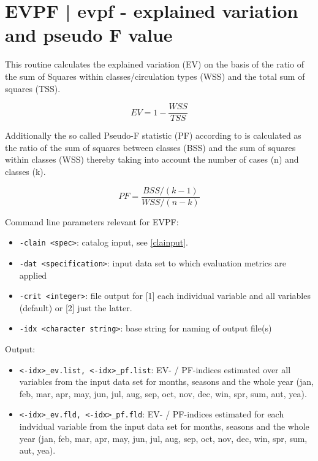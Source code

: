 \documentclass[12pt, oneside, a4paper, headsepline, plainheadsepline]{scrbook}
\begin{document}
\section{EVPF | evpf - explained variation and pseudo F value}

This routine calculates the explained variation (EV) on the basis of the ratio of the sum of Squares within classes/circulation types (WSS) and the total sum of squares (TSS).

\begin{equation}
EV = 1 - \frac{WSS}{TSS}
\end{equation}

Additionally the so called Pseudo-F statistic (PF) according to  \citet{Calinski1974} is calculated as the ratio of the sum of squares between classes (BSS) and the sum of squares within classes (WSS) thereby taking into account the number of cases (n) and classes (k).

\begin{equation}
PF = \frac {BSS / (k-1)}  {WSS / (n-k)}
\end{equation}

Command line parameters relevant for EVPF:
\begin{itemize}
\item \verb+-clain <spec>+:  catalog input, see \ref{clainput}.
\item \verb+-dat <specification>+: input data set to which evaluation metrics are applied
\item \verb+-crit <integer>+: file output for [1] each individual variable and all variables (default) or [2] just the latter.
\item \verb+-idx <character string>+: base string for naming of output file(s)
\end{itemize}

Output:
\begin{itemize}
\item \verb+<-idx>_ev.list, <-idx>_pf.list+: EV- / PF-indices estimated over all variables from the input data set for months, seasons and the whole year (jan, feb, mar, apr, may, jun, jul, aug, sep, oct, nov, dec, win, spr, sum, aut, yea).
\item \verb+<-idx>_ev.fld, <-idx>_pf.fld+: EV- / PF-indices estimated for each indvidual variable from the input data set for months, seasons and the whole year (jan, feb, mar, apr, may, jun, jul, aug, sep, oct, nov, dec, win, spr, sum, aut, yea).
\end{itemize}
\end{document}
